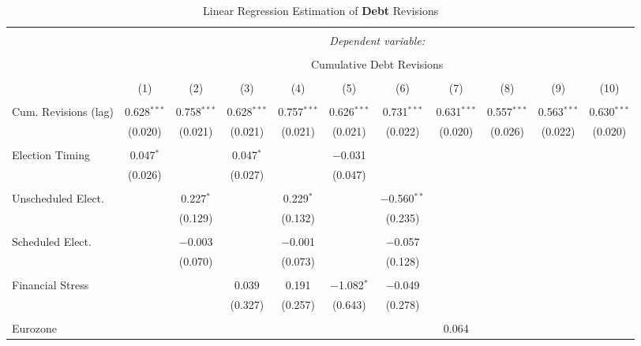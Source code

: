 
\begin{table}[!htbp] \centering 
  \caption{Linear Regression Estimation of \textbf{Debt} Revisions} 
  \label{debt_results} 
\tiny 
\begin{tabular}{@{\extracolsep{5pt}}lcccccccccc} 
\\[-1.8ex]\hline 
\hline \\[-1.8ex] 
 & \multicolumn{10}{c}{\textit{Dependent variable:}} \\ 
\cline{2-11} 
\\[-1.8ex] & \multicolumn{10}{c}{Cumulative Debt Revisions} \\ 
\\[-1.8ex] & (1) & (2) & (3) & (4) & (5) & (6) & (7) & (8) & (9) & (10)\\ 
\hline \\[-1.8ex] 
 Cum. Revisions (lag) & 0.628$^{***}$ & 0.758$^{***}$ & 0.628$^{***}$ & 0.757$^{***}$ & 0.626$^{***}$ & 0.731$^{***}$ & 0.631$^{***}$ & 0.557$^{***}$ & 0.563$^{***}$ & 0.630$^{***}$ \\ 
  & (0.020) & (0.021) & (0.021) & (0.021) & (0.021) & (0.022) & (0.020) & (0.026) & (0.022) & (0.020) \\ 
  & & & & & & & & & & \\ 
 Election Timing & 0.047$^{*}$ &  & 0.047$^{*}$ &  & $-$0.031 &  &  &  &  &  \\ 
  & (0.026) &  & (0.027) &  & (0.047) &  &  &  &  &  \\ 
  & & & & & & & & & & \\ 
 Unscheduled Elect. &  & 0.227$^{*}$ &  & 0.229$^{*}$ &  & $-$0.560$^{**}$ &  &  &  &  \\ 
  &  & (0.129) &  & (0.132) &  & (0.235) &  &  &  &  \\ 
  & & & & & & & & & & \\ 
 Scheduled Elect. &  & $-$0.003 &  & $-$0.001 &  & $-$0.057 &  &  &  &  \\ 
  &  & (0.070) &  & (0.073) &  & (0.128) &  &  &  &  \\ 
  & & & & & & & & & & \\ 
 Financial Stress &  &  & 0.039 & 0.191 & $-$1.082$^{*}$ & $-$0.049 &  &  &  &  \\ 
  &  &  & (0.327) & (0.257) & (0.643) & (0.278) &  &  &  &  \\ 
  & & & & & & & & & & \\ 
 Eurozone &  &  &  &  &  &  & 0.064 &  &  &  \\ 

\end{tabular}
\end{table}
